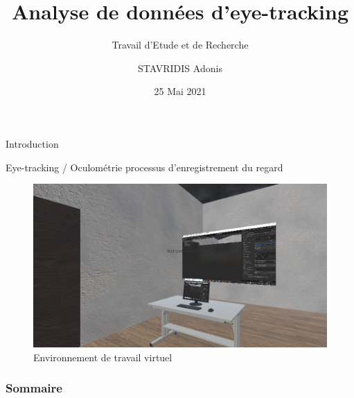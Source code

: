 \documentclass{beamer}
\title[Analyse de données d'eye-tracking]{Analyse de données d'eye-tracking}
\subtitle{Travail d'Etude et de Recherche}
\author[STAVRIDIS Adonis]{STAVRIDIS Adonis}
\institute[Unistra, iCube]{
  Université de Strasbourg \and iCube \and 
  Antonio Capobianco, Flavien Lécuyer
}
\date[TER]{25 Mai 2021}
\begin{document}

\frame{\titlepage}
\begin{frame}{Introduction}
  \begin{block}{Eye-tracking / Oculométrie}
    processus d'enregistrement du regard
  \end{block}
  \pause
  \begin{figure}
    \includegraphics[height=0.35\textwidth]{environnement.png}
    \caption{Environnement de travail virtuel}
  \end{figure}
\end{frame}
\begin{frame}
  \frametitle{Sommaire}
  \tableofcontents
\end{frame}
\end{document}
